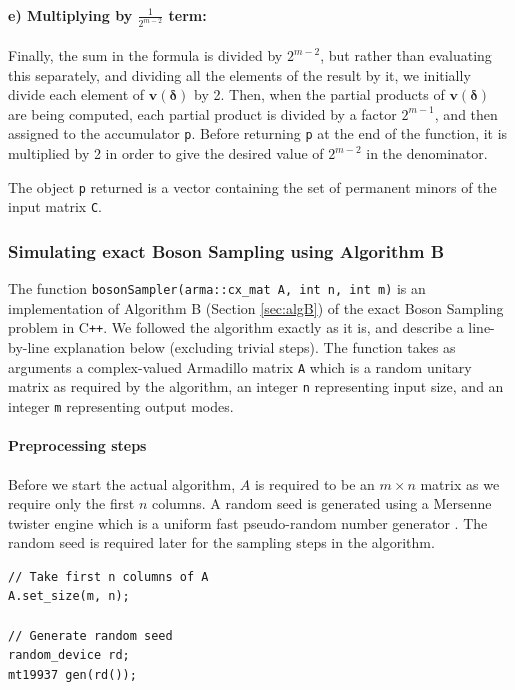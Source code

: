 \documentclass[11pt]{article}
\theoremstyle{theorem}
\theoremstyle{remark}
\theoremstyle{plain}
\theoremstyle{definition}
\begin{document}
\paragraph{e) Multiplying by $\frac{1}{2^{m-2}}$ term:} Finally, the sum in the formula is divided by $2^{m-2}$, but rather than evaluating this separately, and dividing all the elements of the result by it, we initially divide each element of $\mathbf{v}(\mathbf{\delta})$ by 2. Then, when the partial products of $\mathbf{v}(\mathbf{\delta})$ are being computed, each partial product is divided by a factor $2^{m-1}$, and then assigned to the accumulator \texttt{p}. Before returning  \texttt{p} at the end of the function, it is multiplied by 2 in order to give the desired value of $2^{m-2}$ in the denominator.

The object \texttt{p} returned is a vector containing the set of permanent minors of the input matrix \texttt{C}.

\subsubsection{Simulating exact Boson Sampling using Algorithm B}
The function \texttt{bosonSampler(arma::cx_mat A, int n, int m)} is an implementation of Algorithm B (Section \ref{sec:algB}) of the exact Boson Sampling problem in C\texttt{++}. We followed the algorithm exactly as it is, and describe a line-by-line explanation below (excluding trivial steps). The function takes as arguments a complex-valued Armadillo matrix \texttt{A} which is a random unitary matrix as required by the algorithm, an integer \texttt{n} representing input size, and an integer \texttt{m} representing output modes.
\paragraph{Preprocessing steps} Before we start the actual algorithm, $A$ is required to be an $m \times n$ matrix as we require only the first $n$ columns. A random seed is generated using a Mersenne twister engine which is a uniform fast pseudo-random number generator \cite{matsumoto1998}. The random seed is required later for the sampling steps in the algorithm.
\begin{verbatim}
// Take first n columns of A
A.set_size(m, n);

// Generate random seed
random_device rd;
mt19937 gen(rd());
\end{verbatim}
\end{document}
